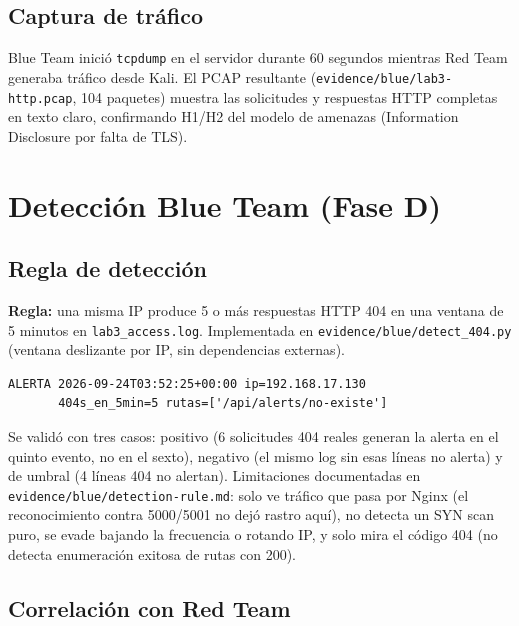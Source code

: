 \documentclass[journal]{IEEEtran}
\begin{document}
\subsection{Captura de tráfico}

Blue Team inició \texttt{tcpdump} en el servidor durante 60 segundos mientras
Red Team generaba tráfico desde Kali. El PCAP resultante
(\texttt{evidence/blue/lab3-http.pcap}, 104 paquetes) muestra las solicitudes
y respuestas HTTP completas en texto claro, confirmando H1/H2 del modelo de
amenazas (Information Disclosure por falta de TLS).

\section{Detección Blue Team (Fase D)}
\label{sec:blueteam}

\subsection{Regla de detección}

\textbf{Regla:} una misma IP produce 5 o más respuestas HTTP 404 en una
ventana de 5 minutos en \texttt{lab3\_access.log}. Implementada en
\texttt{evidence/blue/detect\_404.py} (ventana deslizante por IP, sin
dependencias externas).

\begin{lstlisting}[caption={Validación contra el log real (evidence/blue/detection\_rule\_result.txt)}]
ALERTA 2026-09-24T03:52:25+00:00 ip=192.168.17.130
       404s_en_5min=5 rutas=['/api/alerts/no-existe']
\end{lstlisting}

Se validó con tres casos: positivo (6 solicitudes 404 reales generan la
alerta en el quinto evento, no en el sexto), negativo (el mismo log sin esas
líneas no alerta) y de umbral (4 líneas 404 no alertan). Limitaciones
documentadas en \texttt{evidence/blue/detection-rule.md}: solo ve tráfico que
pasa por Nginx (el reconocimiento contra 5000/5001 no dejó rastro aquí),
no detecta un SYN scan puro, se evade bajando la frecuencia o rotando IP, y
solo mira el código 404 (no detecta enumeración exitosa de rutas con 200).

\subsection{Correlación con Red Team}
\end{document}
